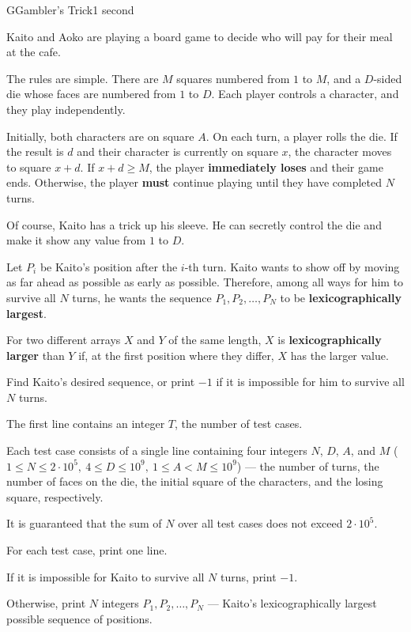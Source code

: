 \begin{problem}{G}{Gambler's Trick}{1 second}

\noindent
Kaito and Aoko are playing a board game to decide who will pay for their meal at the cafe.

\noindent
The rules are simple. There are $M$ squares numbered from $1$ to $M$, and a $D$-sided die whose faces are numbered from $1$ to $D$. Each player controls a character, and they play independently.

\noindent
Initially, both characters are on square $A$. On each turn, a player rolls the die. If the result is $d$ and their character is currently on square $x$, the character moves to square $x+d$. If $x+d \ge M$, the player \textbf{immediately loses} and their game ends. Otherwise, the player \textbf{must} continue playing until they have completed $N$ turns.

\noindent
Of course, Kaito has a trick up his sleeve. He can secretly control the die and make it show any value from $1$ to $D$.

\noindent
Let $P_i$ be Kaito's position after the $i$-th turn. Kaito wants to show off by moving as far ahead as possible as early as possible. Therefore, among all ways for him to survive all $N$ turns, he wants the sequence $P_1,P_2,\ldots,P_N$ to be \textbf{lexicographically largest}.

\noindent
For two different arrays $X$ and $Y$ of the same length, $X$ is \textbf{lexicographically larger} than $Y$ if, at the first position where they differ, $X$ has the larger value.

\noindent
Find Kaito's desired sequence, or print $-1$ if it is impossible for him to survive all $N$ turns.

\InputFile

\noindent
The first line contains an integer $T$, the number of test cases.

\noindent
Each test case consists of a single line containing four integers $N$, $D$, $A$, and $M$ ($1 \le N \le 2 \cdot 10^5,\ 4 \le D \le 10^9,\ 1 \le A < M \le 10^9$) --- the number of turns, the number of faces on the die, the initial square of the characters, and the losing square, respectively.

\noindent
It is guaranteed that the sum of $N$ over all test cases does not exceed $2 \cdot 10^5$.

\OutputFile

\noindent
For each test case, print one line.

\noindent
If it is impossible for Kaito to survive all $N$ turns, print $-1$.

\noindent
Otherwise, print $N$ integers $P_1, P_2, \ldots, P_N$ --- Kaito's lexicographically largest possible sequence of positions.

\Examples

\begin{example}
\end{example}

\pagebreak

\end{problem}
